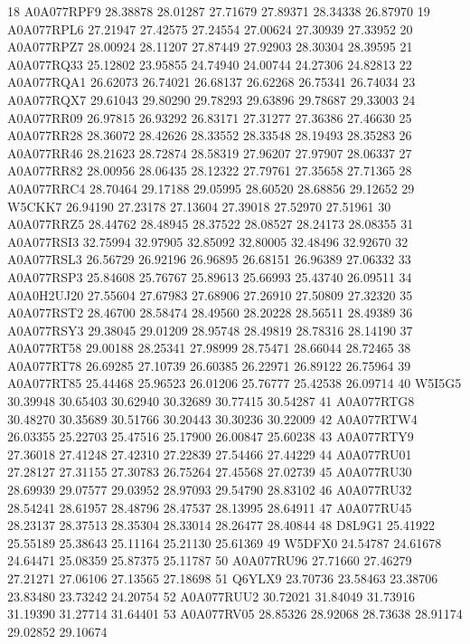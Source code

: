 \documentclass{beamer}
\begin{document}
\begin{frame}[fragile]
\begin{itemize}
\begin{Schunk}
\begin{Soutput}
18   A0A077RPF9 28.38878 28.01287 27.71679  27.89371  28.34338  26.87970
19   A0A077RPL6 27.21947 27.42575 27.24554  27.00624  27.30939  27.33952
20   A0A077RPZ7 28.00924 28.11207 27.87449  27.92903  28.30304  28.39595
21   A0A077RQ33 25.12802 23.95855 24.74940  24.00744  24.27306  24.82813
22   A0A077RQA1 26.62073 26.74021 26.68137  26.62268  26.75341  26.74034
23   A0A077RQX7 29.61043 29.80290 29.78293  29.63896  29.78687  29.33003
24   A0A077RR09 26.97815 26.93292 26.83171  27.31277  27.36386  27.46630
25   A0A077RR28 28.36072 28.42626 28.33552  28.33548  28.19493  28.35283
26   A0A077RR46 28.21623 28.72874 28.58319  27.96207  27.97907  28.06337
27   A0A077RR82 28.00956 28.06435 28.12322  27.79761  27.35658  27.71365
28   A0A077RRC4 28.70464 29.17188 29.05995  28.60520  28.68856  29.12652
29       W5CKK7 26.94190 27.23178 27.13604  27.39018  27.52970  27.51961
30   A0A077RRZ5 28.44762 28.48945 28.37522  28.08527  28.24173  28.08355
31   A0A077RSI3 32.75994 32.97905 32.85092  32.80005  32.48496  32.92670
32   A0A077RSL3 26.56729 26.92196 26.96895  26.68151  26.96389  27.06332
33   A0A077RSP3 25.84608 25.76767 25.89613  25.66993  25.43740  26.09511
34   A0A0H2UJ20 27.55604 27.67983 27.68906  27.26910  27.50809  27.32320
35   A0A077RST2 28.46700 28.58474 28.49560  28.20228  28.56511  28.49389
36   A0A077RSY3 29.38045 29.01209 28.95748  28.49819  28.78316  28.14190
37   A0A077RT58 29.00188 28.25341 27.98999  28.75471  28.66044  28.72465
38   A0A077RT78 26.69285 27.10739 26.60385  26.22971  26.89122  26.75964
39   A0A077RT85 25.44468 25.96523 26.01206  25.76777  25.42538  26.09714
40       W5I5G5 30.39948 30.65403 30.62940  30.32689  30.77415  30.54287
41   A0A077RTG8 30.48270 30.35689 30.51766  30.20443  30.30236  30.22009
42   A0A077RTW4 26.03355 25.22703 25.47516  25.17900  26.00847  25.60238
43   A0A077RTY9 27.36018 27.41248 27.42310  27.22839  27.54466  27.44229
44   A0A077RU01 27.28127 27.31155 27.30783  26.75264  27.45568  27.02739
45   A0A077RU30 28.69939 29.07577 29.03952  28.97093  29.54790  28.83102
46   A0A077RU32 28.54241 28.61957 28.48796  28.47537  28.13995  28.64911
47   A0A077RU45 28.23137 28.37513 28.35304  28.33014  28.26477  28.40844
48       D8L9G1 25.41922 25.55189 25.38643  25.11164  25.21130  25.61369
49       W5DFX0 24.54787 24.61678 24.64471  25.08359  25.87375  25.11787
50   A0A077RU96 27.71660 27.46279 27.21271  27.06106  27.13565  27.18698
51       Q6YLX9 23.70736 23.58463 23.38706  23.83480  23.73242  24.20754
52   A0A077RUU2 30.72021 31.84049 31.73916  31.19390  31.27714  31.64401
53   A0A077RV05 28.85326 28.92068 28.73638  28.91174  29.02852  29.10674

\end{Soutput}
\end{Schunk}
\end{itemize}
\end{frame}
\end{document}
